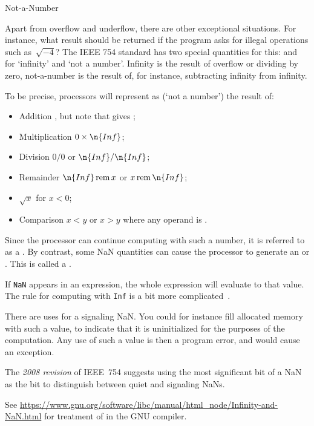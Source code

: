  {Not-a-Number}
\label{sec:754nan}

Apart from overflow and underflow, there are other
exceptional situations.
For instance,
what result should be returned if the program asks for
illegal operations such as~$\sqrt{-4}$? The IEEE 754 standard has two
special quantities for this:
 and~ for `infinity' and `not a number'.
Infinity is the result of overflow or
dividing by zero, not-a-number is the result of, for instance,
subtracting infinity from infinity.  

To be precise,
processors will represent as  
(`not a number')
the result of:

\begin{itemize}
\item Addition , but note that  gives ;
\item Multiplication $0\times\n{Inf}$;
\item Division $0/0$ or $\n{Inf}/\n{Inf}$;
\item Remainder $\n{Inf}\mathop{\mathrm{rem}} x$ or
  $x\mathop{\mathrm{rem}} \n{Inf}$;
\item $\sqrt{x}$ for $x<0$;
\item Comparison $x<y$ or $x>y$ where any operand is .
\end{itemize}

Since the processor can continue computing with such a number, it is
referred to as a .
 By contrast, some NaN
quantities can cause the processor to generate an
 or . This is called a
. 

If \texttt{NaN} appears in an
expression, the whole expression will evaluate to that value. The rule
for computing with \texttt{Inf} is a bit more
complicated~\cite{goldberg:floatingpoint}.

There are uses for a signaling NaN. You could for instance fill
allocated memory with such a value, to indicate that it is
uninitialized for the purposes of the computation. Any use of such a
value is then a program error, and would cause an exception.

The \emph{2008 revision}%
 of IEEE~754 suggests using the most
significant bit of a NaN as the  bit to distinguish
between quiet and signaling NaNs.

See \url{https://www.gnu.org/software/libc/manual/html_node/Infinity-and-NaN.html}
for treatment of  in the GNU compiler.

